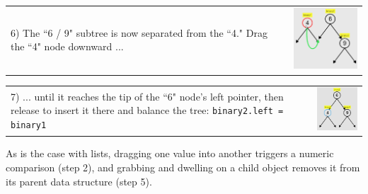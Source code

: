 \noindent \begin{tabular}{m{4.6cm} m{3.4cm}}

6) The ``6 / 9" subtree is now separated from the ``4." Drag the ``4"
node downward ...

& \includegraphics[width=3.4cm]{img/examples/bst-6.png}
\end{tabular}

\noindent \begin{tabular}{m{4.6cm} m{3.4cm}}

7) ... until it reaches the tip of the ``6" node's left pointer, then
release to insert it there and balance the tree: \texttt{binary2.left =
binary1}

& \includegraphics[width=3.4cm]{img/examples/bst-7.png}
\end{tabular}

As is the case with lists, dragging one value into another triggers a
numeric comparison (step 2), and grabbing and dwelling on a child object
removes it from its parent data structure (step 5).


